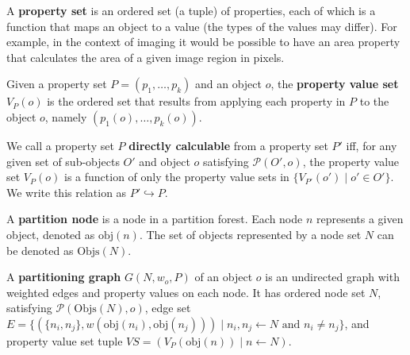 \begin{definition}
A \textbf{property set} is an ordered set (a tuple) of properties, each of which is a function that maps an object to a value (the types of the values may differ). For example, in the context of imaging it would be possible to have an area property that calculates the area of a given image region in pixels.
\end{definition}

\begin{definition}
Given a property set $P = (p_1,\ldots,p_k)$ and an object $o$, the \textbf{property value set} $V_P(o)$ is the ordered set that results from applying each property in $P$ to the object $o$, namely $(p_1(o),\ldots,p_k(o))$.
\end{definition}

\begin{definition}
We call a property set $P$ \textbf{directly calculable} from a property set $P'$ iff, for any given set of sub-objects $O'$ and object $o$ satisfying $\mathcal{P}(O',o)$, the property value set $V_P(o)$ is a function of only the property value sets in $\{V_{P'}(o') \; | \; o' \in O'\}$. We write this relation as $P' \hookrightarrow P$.
\end{definition}

\begin{definition}
A \textbf{partition node} is a node in a partition forest. Each node $n$ represents a given object, denoted as $\mbox{obj}(n)$. The set of objects represented by a node set $N$ can be denoted as $\mbox{Objs}(N)$.
\end{definition}

\begin{definition}
A \textbf{partitioning graph} $G(N,w_o,P)$ of an object $o$ is an undirected graph with weighted edges and property values on each node. It has ordered node set $N$, satisfying $\mathcal{P}(\mbox{Objs}(N),o)$, edge set $E = \{(\{n_i,n_j\},w(\mbox{obj}(n_i),\mbox{obj}(n_j))) \; | \; n_i, n_j \leftarrow N \mbox{ and } n_i \ne n_j\}$, and property value set tuple $\textit{VS} = (V_P(\mbox{obj}(n)) \; | \; n \leftarrow N)$.
\end{definition}

